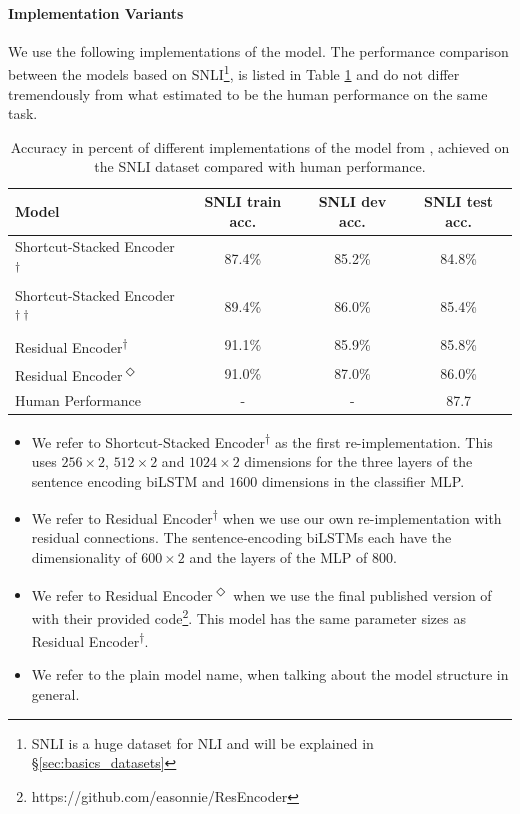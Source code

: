 \paragraph*{Implementation Variants}
We use the following implementations of the model. The performance comparison between the models based on SNLI\footnote{SNLI is a huge dataset for \ac{NLI} and will be explained in §\ref{sec:basics_datasets}}, is listed in Table \ref{table:reimplementation_performance} and do not differ tremendously from what \cite{gong2017natural} estimated to be the human performance on the same task.
\begin{table}[!htbp]
\begin{center}
\begin{tabular}{lccc}
\textbf{Model} & \textbf{SNLI train acc.} & \textbf{SNLI dev acc.} & \textbf{SNLI test acc.}\\
\toprule
Shortcut-Stacked Encoder\textsuperscript{$\dagger$} & 87.4\% & 85.2\% & 84.8\% \\
Shortcut-Stacked Encoder\textsuperscript{$\dagger\dagger$} & 89.4\% & 86.0\% & 85.4\% \\
Residual Encoder\textsuperscript{$\dagger$} & 91.1\% & 85.9\% & 85.8\% \\
Residual Encoder\textsuperscript{$\Diamond$} & 91.0\% & 87.0\% & 86.0\% \\
\midrule
Human Performance \citep{gong2017natural} & - & - & 87.7 \\
\bottomrule
\end{tabular}
\caption{Accuracy in percent of different implementations of the model from \cite{nie2017shortcut}, achieved on the SNLI dataset compared with human performance.}
\label{table:reimplementation_performance}
\end{center}
\end{table}
\begin{itemize}
\item We refer to Shortcut-Stacked Encoder\textsuperscript{$\dagger$} as the first re-implementation. This uses $256\times2$, $512\times2$ and $1024\times2$ dimensions for the three layers of the sentence encoding \ac{biLSTM} and $1600$ dimensions in the classifier \ac{MLP}.
\item We refer to Residual Encoder\textsuperscript{$\dagger$} when we use our own re-implementation with residual connections. The sentence-encoding \ac{biLSTM}s each have the dimensionality of $600\times2$ and the layers of the \ac{MLP} of $800$.
\item We refer to Residual Encoder\textsuperscript{$\Diamond$} when we use the final published version of \cite{nie2017shortcut} with their provided code\footnote{https://github.com/easonnie/ResEncoder}. This model has the same parameter sizes as Residual Encoder\textsuperscript{$\dagger$}.
\item We refer to the plain model name, when talking about the model structure in general.
\end{itemize}
